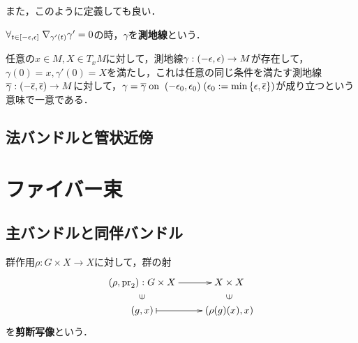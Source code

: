 \documentclass[uplatex,dvipdfmx]{jsreport}
\begin{document}
また，このように定義しても良い．

\begin{definition}
    $\forall_{t\in[-\epsilon,\epsilon]}\;\nabla_{\gamma'(t)}\gamma'=0$の時，$\gamma$を\textbf{測地線}という．
\end{definition}

\begin{lemma}[測地線の存在と一意性]
    任意の$x\in M,X\in T_xM$に対して，測地線$\gamma:(-\epsilon,\epsilon)\to M$が存在して，$\gamma(0)=x,\gamma'(0)=X$を満たし，これは任意の同じ条件を満たす測地線$\overline{\gamma}:(-\overline{\epsilon},\overline{\epsilon})\to M$に対して，$\gamma=\overline{\gamma}\;\mathrm{on}\;\;(-\epsilon_0,\epsilon_0)\;(\epsilon_0:=\min\left\{\epsilon,\overline{\epsilon}\right\})$が成り立つという意味で一意である．
\end{lemma}

\section{法バンドルと管状近傍}

\chapter{ファイバー束}

\section{主バンドルと同伴バンドル}

\begin{definition}
    群作用$\rho:G\times X\to X$に対して，群の射
    \[\xymatrix@R-2pc{
            (\rho,\pr_2):G\times X\ar[r]&X\times X\\
            \rotatebox[origin=c]{90}{$\in$}&\rotatebox[origin=c]{90}{$\in$}\\
            (g,x)\ar@{|->}[r]&(\rho(g)(x),x)
    }\]
    を\textbf{剪断写像}という．
\end{definition}
\end{document}
